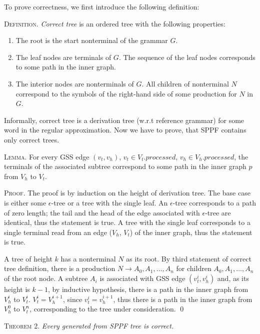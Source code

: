 To prove correctness, we first introduce the following definition:

\textsc{Definition.} 
\emph{Correct tree} is an ordered tree with the following properties:
\begin{enumerate}
  \item The root is the start nonterminal of the grammar $G$.
  \item The leaf nodes are terminals of $G$. The sequence of the leaf nodes 
        corresponds to some path in the inner graph. 
  \item The interior nodes are nonterminals of $G$. All children of nonterminal 
        $N$ correspond to the symbols of the right-hand side of some production for $N$ in $G$.
\end{enumerate}

Informally, correct tree is a derivation tree (w.r.t reference grammar) for some word in 
the regular approximation. Now we have to prove, that SPPF contains only correct trees.

\textsc{Lemma.}
For every GSS edge $(v_{t}, v_{h})$, $v_{t} \in V_{t}.processed$, $v_{h} \in V_{h}.processed$, 
the terminals of the associated subtree correspond to some path in the inner graph $p$ 
from $V_{h}$ to $V_{t}$.

\textsc{Proof.}
The proof is by induction on the height of derivation tree. 
The base case is either some $\epsilon$-tree or a tree with the single leaf. An $\epsilon$-tree corresponds 
to a path of zero length; the tail and the head of the edge associated with $\epsilon$-tree are identical, 
thus the statement is true. A tree with the single leaf corresponds to a single terminal read from an edge 
($V_{h}$, $V_{t}$) of the inner graph, thus the statement is true.

A tree of height $k$ has a nonterminal $N$ as its root. By third statement of correct tree definition, 
there is a production $N \rightarrow A_{0}, A_{1}, \dots, A_{n}$ for children $A_{0}, A_{1}, \dots, A_{n}$ of the root node. 
A subtree $A_{i}$ is associated with GSS edge $(v_{t}^{i}, v_{h}^{i})$ and, as its height is $k-1$, by inductive hypothesis,
there is a path in the inner graph from $V_{h}^{i}$ to $V_{t}^{i}$. $V_{t}^i = V_{h}^{i+1}$, since $v_{t}^i = v_{h}^{i+1}$, 
thus there is a path in the inner graph from $V_{h}^{0}$ to $V_{t}^{n}$, corresponding to the tree under consideration.
\qed

\textsc{Theorem 2.} 
\textit{Every generated from SPPF tree is correct.}

